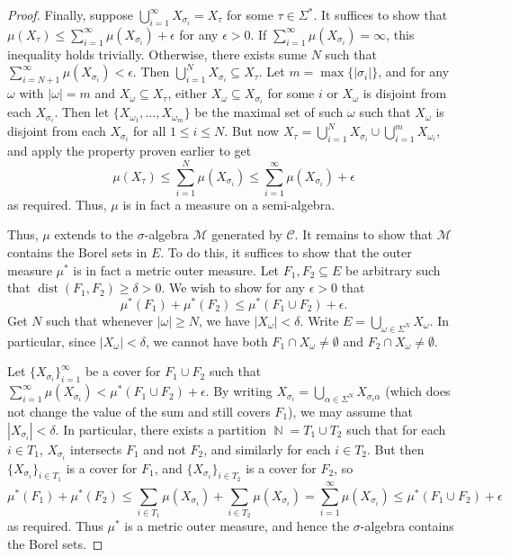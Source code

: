 \documentclass[11pt, a4paper]{memoir}
\DeclareMathOperator{\N}{{\mathbb{N}}}
\theoremstyle{change}
\theoremstyle{plain}
\theoremstyle{nonumberplain}
\newtheorem{proof}{Proof}
\DeclareMathOperator{\dist}{dist}
\numberwithin{equation}{section}
\begin{document}
\begin{proof}
    Finally, suppose $\bigcup_{i=1}^\infty X_{\sigma_i}=X_\tau$ for some $\tau\in\Sigma^*$.
    It suffices to show that $\mu(X_\tau)\leq\sum_{i=1}^\infty\mu(X_{\sigma_i})+\epsilon$ for any $\epsilon>0$.
    If $\sum_{i=1}^\infty\mu(X_{\sigma_i})=\infty$, this inequality holds trivially.
    Otherwise, there exists sume $N$ such that $\sum_{i=N+1}^\infty\mu(X_{\sigma_i})<\epsilon$.
    Then $\bigcup_{i=1}^N X_{\sigma_i}\subseteq X_\tau$.
    Let $m=\max\{|\sigma_i|\}$, and for any $\omega$ with $|\omega|=m$ and $X_\omega\subseteq X_\tau$, either $X_\omega\subseteq X_{\sigma_i}$ for some $i$ or $X_\omega$ is disjoint from each $X_{\sigma_i}$.
    Then let $\{X_{\omega_1},\ldots,X_{\omega_m}\}$ be the maximal set of such $\omega$ such that $X_{\omega}$ is disjoint from each $X_{\sigma_i}$ for all $1\leq i\leq N$.
    But now $X_\tau=\bigcup_{i=1}^N X_{\sigma_i}\cup\bigcup_{i=1}^m X_{\omega_i}$, and apply the property proven earlier to get
    \begin{equation*}
        \mu(X_\tau) \leq \sum_{i=1}^N\mu(X_{\sigma_i})\leq\sum_{i=1}^\infty\mu(X_{\sigma_i})+\epsilon
    \end{equation*}
    as required.
    Thus, $\mu$ is in fact a measure on a semi-algebra.

    Thus, $\mu$ extends to the $\sigma$-algebra $\mathcal{M}$ generated by $\mathcal{C}$.
    It remains to show that $\mathcal{M}$ contains the Borel sets in $E$.
    To do this, it suffices to show that the outer measure $\mu^*$ is in fact a metric outer measure.
    Let $F_1,F_2\subseteq E$ be arbitrary such that $\dist(F_1,F_2)\geq\delta>0$.
    We wish to show for any $\epsilon>0$ that
    \begin{equation*}
        \mu^*(F_1)+\mu^*(F_2)\leq\mu^*(F_1\cup F_2)+\epsilon.
    \end{equation*}
    Get $N$ such that whenever $|\omega|\geq N$, we have $|X_\omega|<\delta$.
    Write $E=\bigcup_{\omega\in \Sigma^N}X_\omega$.
    In particular, since $|X_\omega|<\delta$, we cannot have both $F_1\cap X_\omega\neq\emptyset$ and $F_2\cap X_\omega\neq\emptyset$.

    Let $\{X_{\sigma_i}\}_{i=1}^\infty$ be a cover for $F_1\cup F_2$ such that $\sum_{i=1}^\infty \mu(X_{\sigma_i})<\mu^*(F_1\cup F_2)+\epsilon$.
    By writing $X_{\sigma_i}=\bigcup_{\alpha\in\Sigma^N}X_{\sigma_i\alpha}$ (which does not change the value of the sum and still covers $F_1$), we may assume that $|X_{\sigma_i}|<\delta$.
    In particular, there exists a partition $\N=T_1\cup T_2$ such that for each $i\in T_1$, $X_{\sigma_i}$ intersects $F_1$ and not $F_2$, and similarly for each $i\in T_2$.
    But then $\{X_{\sigma_i}\}_{i\in T_1}$ is a cover for $F_1$, and $\{X_{\sigma_i}\}_{i\in T_2}$ is a cover for $F_2$, so
    \begin{equation*}
        \mu^*(F_1)+\mu^*(F_2)\leq\sum_{i\in T_1}\mu(X_{\sigma_i})+\sum_{i\in T_2}\mu(X_{\sigma_i})=\sum_{i=1}^\infty \mu(X_{\sigma_i})\leq\mu^*(F_1\cup F_2)+\epsilon
    \end{equation*}
    as required.
    Thus $\mu^*$ is a metric outer measure, and hence the $\sigma$-algebra contains the Borel sets.
\end{proof}
\end{document}
